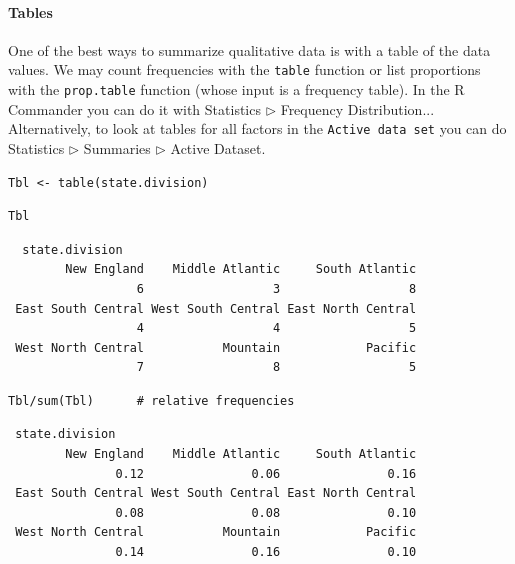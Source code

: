\documentclass[captions=tableheading]{scrbook}
\begin{document}
\label{sub:Displaying-Qualitative-Data}

\paragraph*{Tables}
\label{par:Tables}

One of the best ways to summarize qualitative data is with a table of the data values. We may count frequencies with the \texttt{table} function or list proportions with the \texttt{prop.table} function (whose input is a frequency table). In the \textsf{R} Commander you can do it with \textsf{Statistics} \textsf{\(\triangleright\)} \textsf{Frequency Distribution}... Alternatively, to look at tables for all factors in the \texttt{Active data set} you can do \textsf{Statistics} \textsf{\(\triangleright\)} \textsf{Summaries} \textsf{\(\triangleright\)} \textsf{Active Dataset}.


\begin{verbatim}
Tbl <- table(state.division)
\end{verbatim}


\begin{verbatim}
Tbl
\end{verbatim}

\begin{verbatim}
  state.division
        New England    Middle Atlantic     South Atlantic 
                  6                  3                  8 
 East South Central West South Central East North Central 
                  4                  4                  5 
 West North Central           Mountain            Pacific 
                  7                  8                  5
\end{verbatim}


\begin{verbatim}
Tbl/sum(Tbl)      # relative frequencies
\end{verbatim}

\begin{verbatim}
 state.division
        New England    Middle Atlantic     South Atlantic 
               0.12               0.06               0.16 
 East South Central West South Central East North Central 
               0.08               0.08               0.10 
 West North Central           Mountain            Pacific 
               0.14               0.16               0.10
\end{verbatim}
\end{document}
